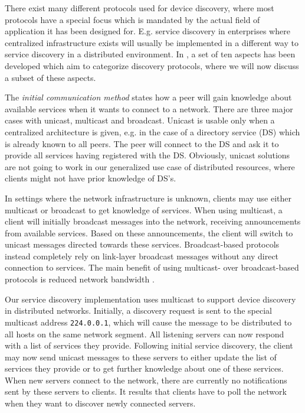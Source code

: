 There exist many different protocols used for device discovery, where most protocols have a special focus which is mandated by the actual field of application it has been designed for.
E.g. service discovery in enterprises where centralized infrastructure exists will usually be implemented in a different way to service discovery in a distributed environment.
In \cite{zhu2005service}, a set of ten aspects has been developed which aim to categorize discovery protocols, where we will now discuss a subset of these aspects.

The \emph{initial communication method} states how a peer will gain knowledge about available services when it wants to connect to a network.
There are three major cases with unicast, multicast and broadcast.
Unicast is usable only when a centralized architecture is given, e.g. in the case of a directory service (DS) which is already known to all peers.
The peer will connect to the DS and ask it to provide all services having registered with the DS.
Obviously, unicast solutions are not going to work in our generalized use case of distributed resources, where clients might not have prior knowledge of DS's.

In settings where the network infrastructure is unknown, clients may use either multicast or broadcast to get knowledge of services.
When using multicast, a client will initially broadcast messages into the network, receiving announcements from available services.
Based on these announcements, the client will switch to unicast messages directed towards these services.
Broadcast-based protocols instead completely rely on link-layer broadcast messages without any direct connection to services.
The main benefit of using multicast- over broadcast-based protocols is reduced network bandwidth \cite{zhu2005service,edwards2006discovery}.

Our service discovery implementation uses multicast to support device discovery in distributed networks.
Initially, a discovery request is sent to the special multicast address \lstinline{224.0.0.1}, which will cause the message to be distributed to all hosts on the same network segment.
All listening servers can now respond with a list of services they provide.
Following initial service discovery, the client may now send unicast messages to these servers to either update the list of services they provide or to get further knowledge about one of these services.
When new servers connect to the network, there are currently no notifications sent by these servers to clients.
It results that clients have to poll the network when they want to discover newly connected servers.

